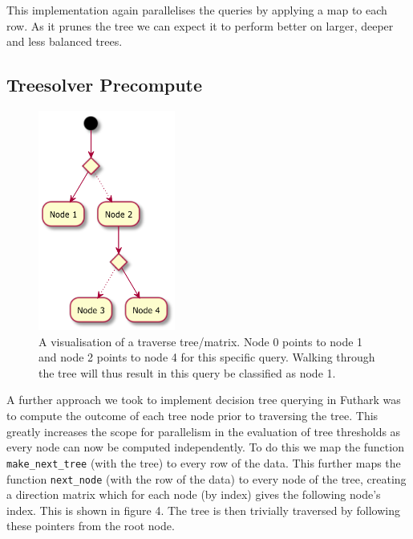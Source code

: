 \documentclass[a4paper]{article}
\begin{document}
\colorbox{lightgray}{\usebox\lstboxthree}

This implementation again parallelises the queries by applying a map to each row. As it prunes the tree we can expect it to perform better on larger, deeper and less balanced trees.

\subsection{Treesolver Precompute}

\begin{figure}
\centering
\includegraphics[width=0.4\textwidth]{tree_traverse}
\caption{\label{fig:frog3}A visualisation of a traverse tree/matrix. Node 0 points to node 1 and node 2 points to node 4 for this specific query. Walking through the tree will thus result in this query be classified as node 1.}
\end{figure}

A further approach we took to implement decision tree querying in Futhark was to compute the outcome of each tree node prior to traversing the tree. This greatly increases the scope for parallelism in the evaluation of tree thresholds as every node can now be computed independently. To do this we map the function \texttt{make\_next\_tree} (with the tree) to every row of the data. This further maps the function \texttt{next\_node} (with the row of the data) to every node of the tree, creating a direction matrix which for each node (by index) gives the following node's index. This is shown in figure 4. The tree is then trivially traversed by following these pointers from the root node.
\end{document}
